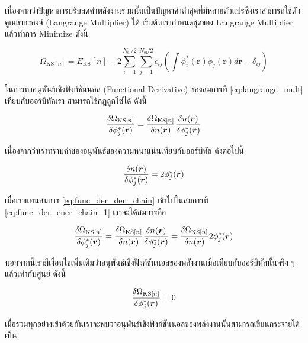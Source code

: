 เนื่องจากว่าปัญหาการปรับลดค่าพลังงานรวมนั้นเป็นปัญหาค่าต่ำสุดที่มีหลายตัวแปรซึ่งเราสามารถใช้ตัวคูณลากรองจ์ (Langrange Multiplier) ได้
เริ่มต้นเรากำหนดชุดของ Langrange Multiplier แล้วทำการ Minimize ดังนี้

\begin{equation}\label{eq:langrange_mult}
    \Omega_{\text{KS}[n]} = E_{\text{KS}}[n] - 2 \sum^{N_{\text{el}}/2}_{i=1} \sum^{N_{\text{el}}/2}_{j=1}
    \epsilon_{ij} \left ( \int \phi^{\ast}_{i}(\bm{r}) \phi_{j}(\bm{r}) d\bm{r} - \delta_{ij} \right )
\end{equation}

\noindent ในการหาอนุพันธ์เชิงฟังก์ชันนอล (Functional Derivative) ของสมการที่ \ref{eq:langrange_mult} เทียบกับออร์บิทัลเรา%
สามารถใช้กฎลูกโซ่ได้ ดังนี้

\begin{equation}\label{eq:func_der_ener_chain_1}
    \fdv{\Omega_{\text{KS}[n]}}{\phi^{\ast}_{j}(\bm{r})} = \fdv{\Omega_{\text{KS}[n]}}{n(\bm{r})}
    \fdv{n(\bm{r})}{\phi^{\ast}_{j}(\bm{r})}
\end{equation}

\noindent เนื่องจากว่าเราทราบค่าของอนุพันธ์ของความหนาแน่นเทียบกับออร์บิทัล ดังต่อไปนี้

\begin{equation}\label{eq:func_der_den_chain}
    \fdv{n(\bm{r})}{\phi^{\ast}_{j}(\bm{r})} = 2 \phi^{\ast}_{j}(\bm{r})
\end{equation}

\noindent เมื่อเราแทนสมการ \ref{eq:func_der_den_chain} เข้าไปในสมการที่ \ref{eq:func_der_ener_chain_1} เราจะได้สมการคือ

\begin{equation}\label{eq:func_der_ener_chain_2}
    \fdv{\Omega_{\text{KS}[n]}}{\phi^{\ast}_{j}(\bm{r})} = \fdv{\Omega_{\text{KS}[n]}}{n(\bm{r})}
    \fdv{n(\bm{r})}{\phi^{\ast}_{j}(\bm{r})} = \fdv{\Omega_{\text{KS}[n]}}{n(\bm{r})} 2 \phi^{\ast}_{j}(\bm{r})
\end{equation}

\noindent นอกจากนี้เรามีเงื่อนไขเพิ่มเติมว่าอนุพันธ์เชิงฟังก์ชันนอลของพลังงานเมื่อเทียบกับออร์บิทัลนั้นจริง ๆ แล้วเท่ากับศูนย์ ดังนี้

\begin{equation}\label{eq:func_der_ener_chain_zero}
    \fdv{\Omega_{\text{KS}[n]}}{\phi^{\ast}_{j}(\bm{r})} = 0
\end{equation}

เมื่อรวมทุกอย่างเข้าด้วยกันเราจะพบว่าอนุพันธ์เชิงฟังก์ชันนอลของพลังงานนั้นสามารถเขียนกระจายได้เป็น

